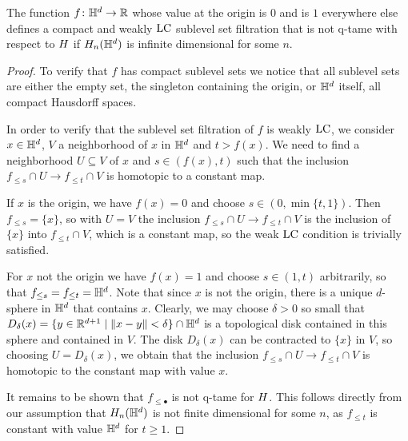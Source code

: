 \begin{thm} \label{t:counterexample}
	The function $f \colon \mathbb{H}^d \to \mathbb{R}$ whose value at the origin is $0$ and is $1$ everywhere else defines a compact and weakly $\mathrm{LC}$ sublevel set filtration that is not q-tame with respect to $H$ if $H_{n}(\mathbb{H}^d)$ is infinite dimensional for some $n$.
\end{thm}

\begin{proof}
	To verify that $f$ has compact sublevel sets we notice that all sublevel sets are either the empty set, the singleton containing the origin, or $\mathbb{H}^d$ itself, all compact Hausdorff spaces.
	
	In order to verify that the sublevel set filtration of $f$ is weakly $\mathrm{LC}$, we
	consider $x \in \mathbb{H}^d$, $V$ a neighborhood of $x$ in $\mathbb{H}^d$ and $t > f(x)$. We need to find a neighborhood $U \subseteq V$ of $x$ and $s \in (f(x), t)$ such that the inclusion $f_{\leq s} \cap U \to f_{\leq t} \cap V$ is homotopic to a constant map.
	
	If $x$ is the origin, we have $f(x) = 0$ and choose $s \in (0, \min\{t, 1\})$.
	Then $f_{\leq s} = \{x\}$, so with $U = V$ the inclusion $f_{\leq s} \cap U \to f_{\leq t} \cap V$ is the inclusion of $\{x\}$ into $f_{\leq t} \cap V$, which is a constant map, so the weak $\mathrm{LC}$ condition is trivially satisfied.
	
	For $x$ not the origin we have $f(x) = 1$ and choose $s \in (1,t)$ arbitrarily, so that $f_{\leq s} = f_{\leq t} = \mathbb{H}^d$. 
	Note that since $x$ is not the origin, there is a unique $d$-sphere in $\mathbb{H}^d$ that contains $x$.
	Clearly, we may choose $\delta > 0$ so small that $D_{\delta}(x) = \{y \in \mathbb{R}^{d+1} \mid \Vert x - y \Vert < \delta\} \cap \mathbb{H}^d$ is a topological disk contained in this sphere and contained in $V$. 
	The disk $D_\delta(x)$ can be contracted to $\{x\}$ in $V$, so choosing $U = D_{\delta}(x)$, we obtain that the inclusion $f_{\leq s} \cap U \to f_{\leq t} \cap V$ is homotopic to the constant map with value $x$.
	
	It remains to be shown that $f_{\leq \bullet}$ is not q-tame for $H$.
	This follows directly from our assumption that $H_{n}(\mathbb{H}^d)$ is not finite dimensional for some $n$, as $f_{\leq t}$ is constant with value $\mathbb{H}^d$ for $t \geq 1$.
\end{proof}

